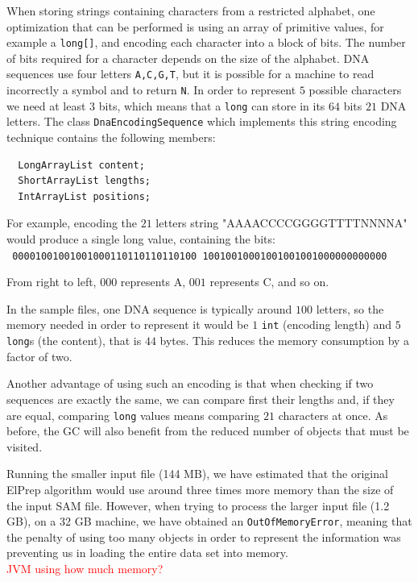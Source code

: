 \documentclass[a4paper,twoside]{article}
\begin{document}
When storing strings containing characters from a restricted alphabet, one optimization that can be performed is using an array of primitive values, for example a {\tt long[]}, and encoding each character into a block of bits. The number of bits required for a character depends on the size of the alphabet.
DNA sequences use four letters {\tt A,C,G,T}, but it is possible for a machine to read incorrectly a symbol and to return {\tt N}. In order to represent $5$ possible characters we need at least $3$ bits,
which means that a {\tt long} can store in its $64$ bits $21$ DNA letters. 
The class {\tt DnaEncodingSequence} which implements this string encoding technique contains the following members:
\begin{verbatim}
  LongArrayList content;
  ShortArrayList lengths;      
  IntArrayList positions;     
\end{verbatim}
For example, encoding the $21$ letters string "AAAACCCCGGGGTTTTNNNNA" would produce a single long value, containing the bits:\\
{\tt
00001001001001000110110110110100
10010010001001001001000000000000
}

From right to left, $000$ represents A, $001$ represents C, and so on.

In the sample files, one DNA sequence is typically around $100$ letters, so the memory needed in order to represent it would be $1$ {\tt int} (encoding length) and $5$ {\tt long}s (the content), that is $44$ bytes. This reduces the memory consumption by a factor of two.

Another advantage of using such an encoding is that when checking if two sequences are exactly the same, we can compare first their lengths and, if they are equal, comparing {\tt long} values means comparing $21$ characters at once.
As before, the GC will also benefit from the reduced number of objects that must be visited.




Running the smaller input file (144 MB), we have estimated that the original ElPrep algorithm would use around three times more memory than the size of the input SAM file.
However, when trying to process the larger input file (1.2 GB), on a 32 GB machine, we have obtained an {\tt OutOfMemoryError}, meaning that the penalty of using too many objects in order to represent the information was preventing us in loading the entire data set into memory.
\\ \textcolor{red}{JVM using how much memory?}
\end{document}
